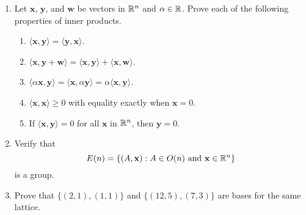 {\begin{enumerate}
\begin{figure}[htb]
\begin{center}
\end{center}
\caption{}
\label{Determine}
\end{figure}
 
 
\item
Let ${\mathbf x}$, ${\mathbf y}$, and ${\mathbf w}$ be vectors in ${\Bbb
R}^n$ and $\alpha \in {\Bbb R}$.  Prove each of the following
properties of inner products.
\begin{enumerate}
 
 \item
$\langle {\mathbf x}, {\mathbf y} \rangle = \langle {\mathbf y}, {\mathbf x}
\rangle$. 
 
 \item
$\langle {\mathbf x}, {\mathbf y} + {\mathbf w} \rangle = \langle
{\mathbf x}, {\mathbf y} \rangle + \langle {\mathbf x}, {\mathbf w}
\rangle$.
 
 \item
$\langle \alpha {\mathbf x}, {\mathbf y} \rangle = \langle
{\mathbf x}, \alpha {\mathbf y} \rangle = \alpha \langle  {\mathbf
x}, {\mathbf y} \rangle$.
 
 \item
$\langle {\mathbf x}, {\mathbf x} \rangle \geq 0$ with equality exactly
when ${\mathbf x} = 0$. 
 
 \item
If $\langle {\mathbf x}, {\mathbf y} \rangle = 0$  for all ${\mathbf x}$ in
${\Bbb R}^n$, then ${\mathbf y} = 0$. 
 
\end{enumerate}
 
 
\item
Verify that
\[
E(n)
=
\{(A, {\mathbf x}) : A \in O(n) \mbox{ and } {\mathbf x} \in
{\Bbb R}^n \}
\]
is a group.
 
 
\item
Prove that $\{ (2,1), (1,1) \}$  and $\{ ( 12, 5), ( 7, 3) \}$ are bases
for the same lattice. 
 

\end{enumerate}}
